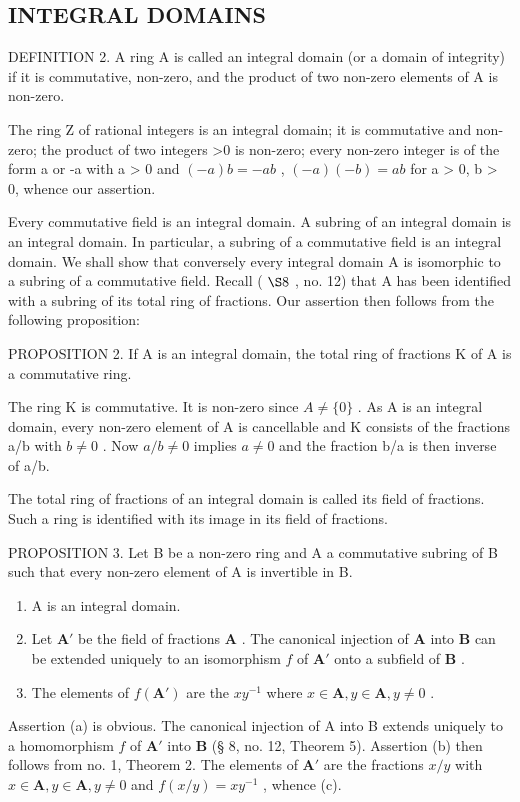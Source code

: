 \subsection{INTEGRAL DOMAINS}

DEFINITION 2. A ring A is called an integral domain (or a domain of integrity) if it is commutative, non-zero, and the product of two non-zero elements of A is non-zero.

The ring Z of rational integers is an integral domain; it is commutative and non-zero; the product of two integers \textgreater0 is non-zero; every non-zero integer is of the form a or -a with a \textgreater{} 0 and \((-a)b = -ab\) , \((-a)(-b) = ab\) for a \textgreater{} 0, b \textgreater{} 0, whence our assertion.

Every commutative field is an integral domain. A subring of an integral domain is an integral domain. In particular, a subring of a commutative field is an integral domain. We shall show that conversely every integral domain A is isomorphic to a subring of a commutative field. Recall ( \(\S 8\) , no. 12) that A has been identified with a subring of its total ring of fractions. Our assertion then follows from the following proposition:

PROPOSITION 2. If A is an integral domain, the total ring of fractions K of A is a commutative ring.

The ring K is commutative. It is non-zero since \(A \neq \{0\}\) . As A is an integral domain, every non-zero element of A is cancellable and K consists of the fractions a/b with \(b \neq 0\) . Now \(a/b \neq 0\) implies \(a \neq 0\) and the fraction b/a is then inverse of a/b.

The total ring of fractions of an integral domain is called its field of fractions. Such a ring is identified with its image in its field of fractions.

PROPOSITION 3. Let B be a non-zero ring and A a commutative subring of B such that every non-zero element of A is invertible in B.

\begin{enumerate}
\def\labelenumi{(\alph{enumi})}
\item
  A is an integral domain.
\item
  Let \(\mathbf{A}'\) be the field of fractions \(\mathbf{A}\) . The canonical injection of \(\mathbf{A}\) into \(\mathbf{B}\) can be extended uniquely to an isomorphism \(f\) of \(\mathbf{A}'\) onto a subfield of \(\mathbf{B}\) .
\item
  The elements of \(f(\mathbf{A}')\) are the \(xy^{-1}\) where \(x \in \mathbf{A}, y \in \mathbf{A}, y \neq 0\) .
\end{enumerate}

Assertion (a) is obvious. The canonical injection of A into B extends uniquely to a homomorphism \(f\) of \(\mathbf{A}'\) into \(\mathbf{B}\) (§ 8, no. 12, Theorem 5). Assertion (b) then follows from no. 1, Theorem 2. The elements of \(\mathbf{A}'\) are the fractions \(x / y\) with \(x \in \mathbf{A}, y \in \mathbf{A}, y \neq 0\) and \(f(x / y) = xy^{-1}\) , whence (c).

